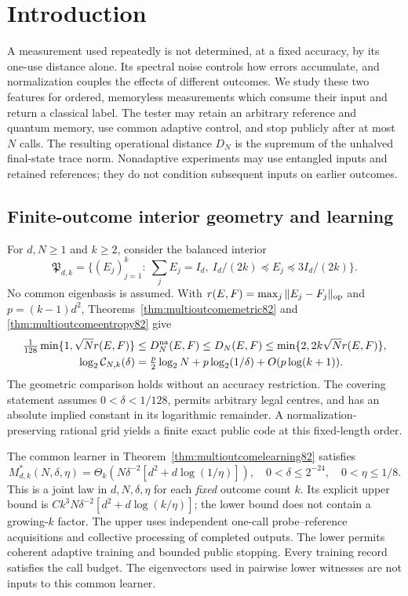 \section{Introduction}
\label{sec:introduction83}

A measurement used repeatedly is not determined, at a fixed accuracy,
by its one-use distance alone.  Its spectral noise controls how errors
accumulate, and normalization couples the effects of different outcomes.
We study these two features for ordered, memoryless measurements which
consume their input and return a classical label.  The tester may retain
an arbitrary reference and quantum memory, use common adaptive control,
and stop publicly after at most $N$ calls.  The resulting operational
distance $D_N$ is the supremum of the unhalved final-state trace norm.
Nonadaptive experiments may use entangled inputs and retained references;
they do not condition subsequent inputs on earlier outcomes.

\subsection{Finite-outcome interior geometry and learning}
For $d,N\ge1$ and $k\ge2$, consider the balanced interior
\[
 \mathfrak P_{d,k}=\{(E_j)_{j=1}^k:\ \sum_jE_j=I_d,
              \ I_d/(2k)\preceq E_j\preceq3I_d/(2k)\}.
\]
No common eigenbasis is assumed.  With
$r(E,F)=\max_j\|E_j-F_j\|_{\rm op}$ and $p=(k-1)d^2$,
Theorems~\ref{thm:multioutcomemetric82} and
\ref{thm:multioutcomeentropy82} give
\begin{align*}
 \tfrac1{128}\min\{1,\sqrt N r(E,F)\}
 &\le D_N^{\rm na}(E,F)\le D_N(E,F)
 \le\min\{2,2k\sqrt N r(E,F)\},\\
 \log_2\mathcal C_{N,k}(\delta)
 &=\tfrac p2\log_2N+p\log_2(1/\delta)+O(p\log(k+1)).
\end{align*}
The geometric comparison holds without an accuracy restriction.  The
covering statement assumes $0<\delta<1/128$, permits arbitrary legal
centres, and has an absolute implied constant in its logarithmic remainder.
A normalization-preserving rational grid yields a finite exact public
code at this fixed-length order.

The common learner in Theorem~\ref{thm:multioutcomelearning82} satisfies
\[
 M^*_{d,k}(N,\delta,\eta)
 =\Theta_k\!\left(N\delta^{-2}[d^2+d\log(1/\eta)]\right),
 \quad 0<\delta\le2^{-24},\quad0<\eta\le1/8.
\]
This is a joint law in $d,N,\delta,\eta$ for each \emph{fixed} outcome
count $k$.  Its explicit upper bound is
$Ck^3N\delta^{-2}[d^2+d\log(k/\eta)]$; the lower bound does not
contain a growing-$k$ factor.  The upper uses independent one-call
probe--reference acquisitions and collective processing of completed
outputs.  The lower permits coherent adaptive training and bounded
public stopping.  Every training record satisfies the call budget.
The eigenvectors used in pairwise lower witnesses are not inputs to
this common learner.

